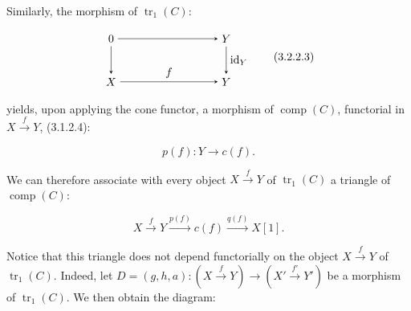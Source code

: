 \clearpage
{}%
Similarly, the morphism of $\operatorname{tr}_1(C)$:

\begin{equation}
  \begin{tikzpicture}[>=stealth,baseline=(current bounding box.center)]
    \node (Z)  at (0,1.35) {$0$};
    \node (Y)  at (3.6,1.35) {$Y$};
    \node (X)  at (0,0) {$X$};
    \node (Yp) at (3.6,0) {$Y$};
    \draw[->] (Z) -- (Y);
    \draw[->] (Z) -- (X);
    \draw[->] (Y) -- node[right] {$\operatorname{id}_Y$} (Yp);
    \draw[->] (X) -- node[above] {$f$} (Yp);
  \end{tikzpicture}
  \tag{3.2.2.3}
\end{equation}

yields, upon applying the cone functor, a morphism of
$\operatorname{comp}(C)$, functorial in $X\xrightarrow{f}Y$, (3.1.2.4):

\begin{equation}
  p(f)\colon Y\longrightarrow c(f).
  \tag{3.2.2.4}
\end{equation}

We can therefore associate with every object $X\xrightarrow{f}Y$ of
$\operatorname{tr}_1(C)$ a triangle of $\operatorname{comp}(C)$:

\begin{equation}
  X\xrightarrow{f}Y\xrightarrow{p(f)}c(f)\xrightarrow{q(f)}X[1].
  \tag{3.2.2.5}
\end{equation}

Notice that this triangle does not depend functorially on the object
$X\xrightarrow{f}Y$ of $\operatorname{tr}_1(C)$.
Indeed, let
$D=(g,h,a)\colon(X\xrightarrow{f}Y)\longrightarrow
(X'\xrightarrow{f'}Y')$
be a morphism of $\operatorname{tr}_1(C)$. We then obtain the diagram:

